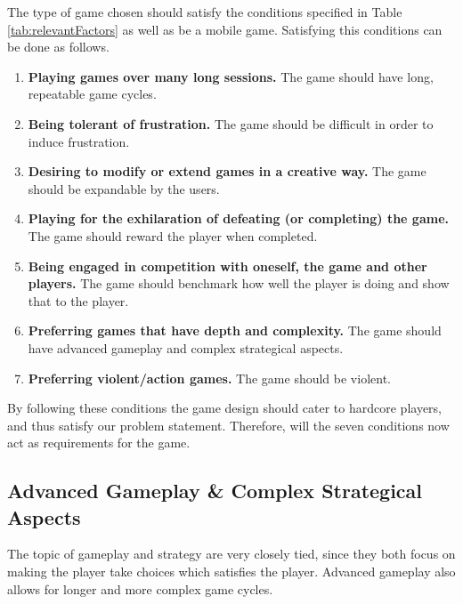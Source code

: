 The type of game chosen should satisfy the conditions specified in Table \ref{tab:relevantFactors} as well as be a mobile game.
Satisfying this conditions can be done as follows.
\begin{enumerate}\label{gamedesign:selectionofgametype:importantstuff}
\item \textbf{Playing games over many long sessions.} The game should have long, repeatable game cycles.
\item \textbf{Being tolerant of frustration.} The game should be difficult in order to induce frustration.
\item \textbf{Desiring to modify or extend games in a creative way.} The game should be expandable by the users.
\item \textbf{Playing for the exhilaration of defeating (or completing) the game.} The game should reward the player when completed.
\item \textbf{Being engaged in competition with oneself, the game and other players.} The game should benchmark how well the player is doing and show that to the player.
\item \textbf{Preferring games that have depth and complexity.} The game should have advanced gameplay and complex strategical aspects.
\item \textbf{Preferring violent/action games.} The game should be violent. 
\end{enumerate}
By following these conditions the game design should cater to hardcore players, and thus satisfy our problem statement. 
Therefore, will the seven conditions now act as requirements for the game.

\subsection{Advanced Gameplay \& Complex Strategical Aspects}
The topic of gameplay and strategy are very closely tied, since they both focus on making the player take choices which satisfies the player.
Advanced gameplay also allows for longer and more complex game cycles.

